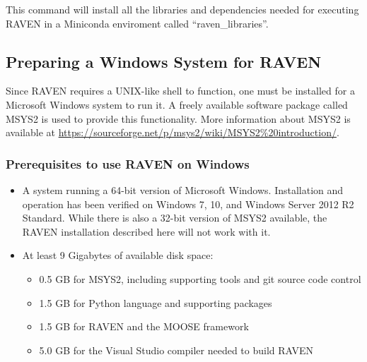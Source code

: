This command will install all the libraries and dependencies needed for executing RAVEN
in a Miniconda enviroment called ``raven\_libraries''.

\goToRavenInstallation


\subsection{Preparing a Windows System for RAVEN}
\label{sysprep_windows}

Since RAVEN requires a UNIX-like shell to function, one must be installed for a Microsoft
Windows system to run it.  A freely available software package called MSYS2 is used to
provide this functionality.  More information about MSYS2 is available at
\url{https://sourceforge.net/p/msys2/wiki/MSYS2%20introduction/}.

\subsubsection{Prerequisites to use RAVEN on Windows}
\begin{itemize}
    \item A system running a 64-bit version of Microsoft Windows. Installation and operation
        has been verified on Windows 7, 10, and Windows Server 2012 R2 Standard. While there
        is also a 32-bit version of MSYS2 available, the RAVEN installation described here will not work with it.
    \item At least 9 Gigabytes of available disk space:
    \begin{itemize}
        \item 0.5 GB for MSYS2, including supporting tools and git source code control
        \item 1.5 GB for Python language and supporting packages
        \item 1.5 GB for RAVEN and the MOOSE framework
        \item 5.0 GB for the Visual Studio compiler needed to build RAVEN
    \end{itemize}
\end{itemize}

